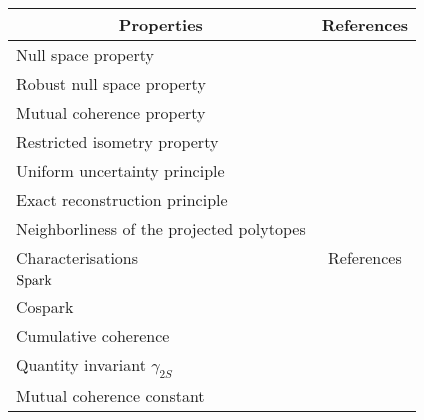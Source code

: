 \begin{table}[!bp]
\begin{adjustbox}{width=1\textwidth} %
\centering
\begin{tabular}{cc}
\toprule
\multicolumn{1}{c}{Properties} & \multicolumn{1}{c}{References} \\ \midrule %
\multicolumn{1}{l}{Null space property} & \multicolumn{1}{l}{\cite{Donoho2001,Elad2001,Gribonval2003a,Feuer2003,Zhang2005a,Stojnic2008,Cohen2009}}
 \\%
\multicolumn{1}{l}{Robust null space property} & \multicolumn{1}{l}{\cite{Davies2009a,Foucart2013}} \\ %
\multicolumn{1}{l}{Mutual coherence property} & \multicolumn{1}{l}{\cite{Donoho2001,Elad2001,Gribonval2003a,Tropp2004,Fuchs2004a,Tropp2006,Gribonval2007}}
 \\ %
\multicolumn{1}{l}{Restricted isometry property} & \multicolumn{1}{l}{\cite{Cand`es2005b,Baraniuk2008,Cand`es2008a}} \\ %
\multicolumn{1}{l}{Uniform uncertainty principle} & \multicolumn{1}{l}{\cite{Cand`es2005b,Cand`es2006b}} \\ %
\multicolumn{1}{l}{Exact reconstruction principle} & \multicolumn{1}{l}{\cite{Cand`es2006b}} \\%
\multicolumn{1}{l}{Neighborliness of the projected polytopes} & \multicolumn{1}{l}{\cite{Vershik1992,Donoho2005b,Donoho2005,Donoho2006d}} \\ \midrule
\multicolumn{1}{l}{Characterisations} & \multicolumn{1}{c}{References}  \\ \midrule %
\multicolumn{1}{l}{$\mathrm{Spark}$} & \multicolumn{1}{l}{\cite{Gribonval2003a,Donoho2003}} \\ %
\multicolumn{1}{l}{Cospark} & \multicolumn{1}{l}{\cite{Cand`es2005b}} \\ %
\multicolumn{1}{l}{Cumulative coherence} & \multicolumn{1}{l}{\cite{Donoho2003,Tropp2004}} \\ %
\multicolumn{1}{l}{Quantity invariant $\gamma_{2S}$} & \multicolumn{1}{l}{\cite{Foucart2009a}} \\
\multicolumn{1}{l}{Mutual coherence constant} & \multicolumn{1}{l}{\cite{Donoho2001,Elad2001,Gribonval2003a,Tropp2004,Fuchs2004a,Tropp2006,Gribonval2007}} \\ %

\end{tabular}
\end{adjustbox}
\end{table}
